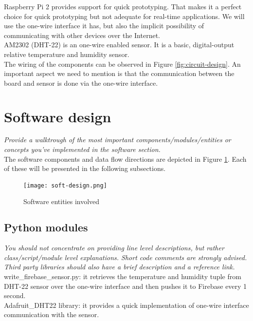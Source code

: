 \documentclass[a4paper,11pt]{article}
\begin{document}
Raspberry Pi 2 provides support for quick prototyping. That makes it a perfect choice for quick prototyping but not adequate for real-time applications. We will use the one-wire interface it has, but also the implicit possibility of communicating with other devices over the Internet. \\

AM2302 (DHT-22) is an one-wire enabled sensor. It is a basic, digital-output relative temperature and humidity sensor.\\

The wiring of the components can be observed in Figure \ref{fig:circuit-design}. An important aspect we need to mention is that the communication between the board and sensor is done via the one-wire interface.


\section{Software design}
\textit{Provide a walktrough of the most important components/modules/entities or concepts you've implemented in the software section.}\\

The software components and data flow directions are depicted in Figure \ref{fig:soft-design}. Each of these will be presented in the following subsections.\\

\begin{figure}[h]
\centering
\texttt{[image: soft-design.png]}
\caption{Software entities involved}
\label{fig:soft-design}
\end{figure}
 
\subsection{Python modules}
\textit{You should not concentrate on providing line level descriptions, but rather class/script/module level explanations. Short code comments are strongly advised. Third party libraries should also have a brief description and a reference link.}\\

write\_firebase\_sensor.py: it retrieves the temperature and humidity tuple from DHT-22 sensor over the one-wire interface and then pushes it to Firebase every 1 second. \\

Adafruit\_DHT22 library: it provides a quick implementation of one-wire interface communication with the sensor.
\end{document}
